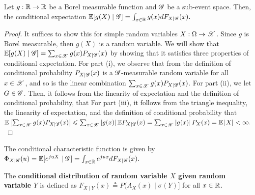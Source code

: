 \documentclass[letterpaper,10pt,english]{article}
\begin{document}
\begin{thm} 
Let $g:\mathbb{R}\to\mathbb{R}$ be a Borel measurable function and $\mathscr{G}$ be a sub-event space. 
Then, the conditional expectation $\mathbb{E}[g(X)\mid\mathscr{G}] = \int_{x\in\mathbb{R}}g(x)dF_{X\mid\mathscr{G}}(x).$
\end{thm}
\begin{proof}
It suffices to show this for simple random variables $X:\Omega\to\mathscr{X}$. 
Since $g$ is Borel measurable, then $g(X)$ is a random variable. 
We will show that $\mathbb{E}[g(X)\mid\mathscr{G}] = \sum_{x\in\mathscr{X}}g(x)P_{X\mid\mathscr{G}}(x)$ by showing that it satisfies three properties of conditional expectation.  
For part (i), we observe that from the definition of conditional probability $P_{X\mid\mathscr{G}}(x)$ is a $\mathscr{G}$-measurable random variable for all $x\in\mathscr{X}$, and so is the linear combination $ \sum_{x\in\mathscr{X}}g(x)P_{X\mid\mathscr{G}}(x)$. 
For part (ii), we let $G \in \mathscr{G}$. 
Then, it follows from the  linearity of expectation and the definition of conditional probability, that 
For part (iii), it follows from the triangle inequality, the linearity of expectation, and the definition of conditional probability that
$
\mathbb{E}\left\lvert\sum_{x\in\mathscr{X}}g(x)P_{X\mid\mathscr{G}}(x)\right\rvert \leqslant \sum_{x\in\mathscr{X}}\left\lvert g(x)\right\rvert \mathbb{E} P_{X\mid\mathscr{G}}(x)
= \sum_{x\in\mathscr{X}}\left\lvert g(x)\right\rvert P_X(x) = \mathbb{E}\left\lvert X\right\rvert < \infty.
$
\end{proof}
\begin{rem} 
The conditional characteristic function is given by 
$\Phi_{X\mid\mathscr{G}}(u) = \mathbb{E}[e^{juX}\mid\mathscr{G}] = \int_{x\in\mathbb{R}}e^{jux}dF_{X\mid\mathscr{G}}(x).$
\end{rem}
\begin{defn}%
The \textbf{conditional distribution of random variable $X$ given random variable $Y$} is defined as $F_{X\mid Y}(x) \triangleq P(A_X(x)\mid\sigma(Y)]$ for all $x\in \mathbb{R}$.
\end{defn}
\end{document}
